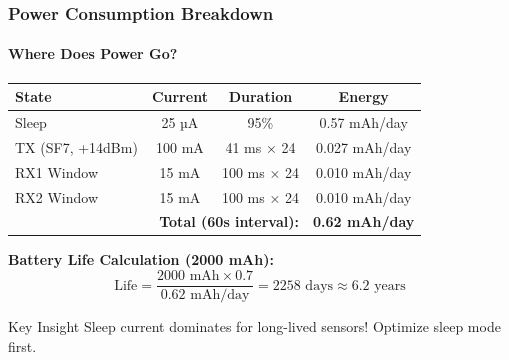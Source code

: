 \documentclass{beamer}
\begin{document}
\begin{frame}
\frametitle{Power Consumption Breakdown}
\framesubtitle{Where Does Power Go?}

\begin{table}
\small
\begin{tabular}{|l|c|c|c|}
\hline
\textbf{State} & \textbf{Current} & \textbf{Duration} & \textbf{Energy} \\
\hline
Sleep & 25 µA & 95\% & 0.57 mAh/day \\
TX (SF7, +14dBm) & 100 mA & 41 ms × 24 & 0.027 mAh/day \\
RX1 Window & 15 mA & 100 ms × 24 & 0.010 mAh/day \\
RX2 Window & 15 mA & 100 ms × 24 & 0.010 mAh/day \\
\hline
\multicolumn{3}{|r|}{\textbf{Total (60s interval):}} & \textbf{0.62 mAh/day} \\
\hline
\end{tabular}
\end{table}

\textbf{Battery Life Calculation (2000 mAh):}
\[
\text{Life} = \frac{2000 \text{ mAh} \times 0.7}{0.62 \text{ mAh/day}} = 2258 \text{ days} \approx 6.2 \text{ years}
\]

\begin{alertblock}{Key Insight}
Sleep current dominates for long-lived sensors! Optimize sleep mode first.
\end{alertblock}
\end{frame}
\end{document}
